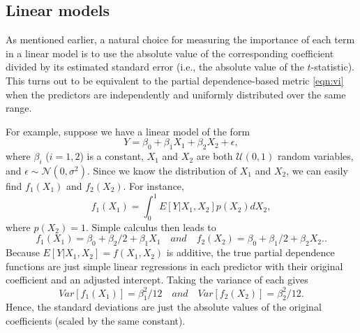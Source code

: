 \documentclass[12pt]{article}
\begin{document}
\subsection{Linear models}
\label{sec:linear}

As mentioned earlier, a natural choice for measuring the importance of each term in a linear model is to use the absolute value of the corresponding coefficient divided by its estimated standard error (i.e., the absolute value of the $t$-statistic). This turns out to be equivalent to the partial dependence-based metric \eqref{eqn:vi} when the predictors are independently and uniformly distributed over the same range.

For example, suppose we have a linear model of the form
\begin{equation*}
  Y = \beta_0 + \beta_1 X_1 + \beta_2 X_2 + \epsilon,
\end{equation*}
where $\beta_i$ ($i = 1, 2$) is a constant, $X_1$ and $X_2$ are both $\mathcal{U}\left(0, 1\right)$ random variables, and $\epsilon \sim \mathcal{N}\left(0, \sigma ^ 2\right)$. Since we know the distribution of $X_1$ and $X_2$, we can easily find $f_1\left(X_1\right)$ and $f_2\left(X_2\right)$. For instance, 
\begin{equation*}
  f_1\left(X_1\right) = \int_0^1 E\left[Y | X_1, X_2\right] p\left(X_2\right) dX_2,
\end{equation*}
where $p\left(X_2\right) = 1$. Simple calculus then leads to 
\begin{equation*}
  f_1\left(X_1\right) = \beta_0 + \beta_2 / 2 + \beta_1 X_1 \quad and \quad f_2\left(X_2\right) = \beta_0 + \beta_1 / 2 + \beta_2 X_2..
\end{equation*}
Because $E\left[Y | X_1, X_2\right] = f\left(X_1, X_2\right)$ is additive, the true partial dependence functions are just simple linear regressions in each predictor with their original coefficient and an adjusted intercept. Taking the variance of each gives
\begin{equation*}
Var\left[f_1\left(X_1\right)\right] = \beta_1 ^ 2 / 12 \quad and \quad Var\left[f_2\left(X_2\right)\right] = \beta_2 ^ 2 / 12.
\end{equation*}
Hence, the standard deviations are just the absolute values of the original coefficients (scaled by the same constant).
\end{document}

